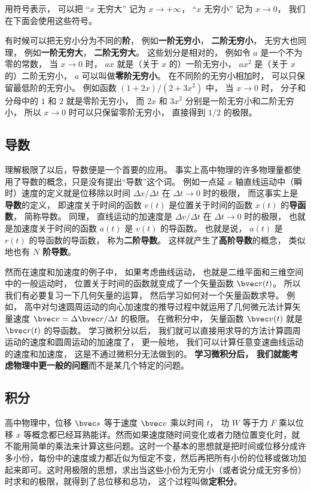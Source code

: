用符号表示， 可以把 “$x$ 无穷大” 记为 $x \to +\infty$， “$x$ 无穷小” 记为 $x \to 0$， 我们在下面会使用这些符号。

有时候可以把无穷小分为不同的\textbf{阶}， 例如\textbf{一阶无穷小}， \textbf{二阶无穷小}， 无穷大也同理， 例如\textbf{一阶无穷大}， \textbf{二阶无穷大}。 这些划分是相对的， 例如令 $a$ 是一个不为零的常数， 当 $x \to 0$ 时， $a x$ 就是（关于 $x$ 的）一阶无穷小， $a x^2$ 是（关于 $x$ 的）二阶无穷小， $a$ 可以叫做\textbf{零阶无穷小}。 在不同阶的无穷小相加时， 可以只保留最低阶的无穷小。 例如函数 $(1+2x)/(2+3x^2)$ 中， 当 $x\to 0$ 时， 分子和分母中的 $1$ 和 $2$ 就是零阶无穷小， 而 $2x$ 和 $3x^2$ 分别是一阶无穷小和二阶无穷小， 所以 $x\to 0$ 时可以只保留零阶无穷小， 直接得到 $1/2$ 的极限。

\subsection{导数}
理解极限了以后，导数便是一个首要的应用。 事实上高中物理的许多物理量都使用了导数的概念，只是没有提出“导数”这个词。 例如一点延 $x$ 轴直线运动中（瞬时）速度的定义就是位移除以时间 $\Delta x/\Delta t$ 在 $\Delta t \to 0$ 时的极限， 而这事实上是\textbf{导数}的定义， 即速度关于时间的函数 $v(t)$ 是位置关于时间的函数 $x(t)$ 的\textbf{导函数}， 简称导数。 同理， 直线运动的加速度是 $\Delta v/\Delta t$ 在 $\Delta t \to 0$ 时的极限， 也就是加速度关于时间的函数 $a(t)$ 是 $v(t)$ 的导函数。 也就是说， $a(t)$ 是 $r(t)$ 的导函数的导函数， 称为\textbf{二阶导数}。 这样就产生了\textbf{高阶导数}的概念， 类似地也有 \textbf{$N$ 阶导数}。

然而在速度和加速度的例子中， 如果考虑曲线运动， 也就是二维平面和三维空间中的一般运动时， 位置关于时间的函数就变成了一个矢量函数 $\bvec r(t)$。 所以我们有必要复习一下几何矢量的运算， 然后学习如何对一个矢量函数求导。 例如， 高中对匀速圆周运动的向心加速度的推导过程中就运用了几何微元法计算矢量速度 $\bvec v = \Delta \bvec r/\Delta t$ 的极限。 在微积分中， 矢量函数 $\bvec v(t)$ 就是 $\bvec r(t)$ 的导函数。 学习微积分以后， 我们就可以直接用求导的方法计算圆周运动的速度和圆周运动的加速度了， 更一般地， 我们可以计算任意变速曲线运动的速度和加速度， 这是不通过微积分无法做到的。 \textbf{学习微积分后， 我们就能考虑物理中更一般的问题}而不是某几个特定的问题。


\subsection{积分}
高中物理中，位移 $\bvec s$ 等于速度 $\bvec v$ 乘以时间 $t$， 功 $W$ 等于力 $F$ 乘以位移 $x$ 等概念都已经耳熟能详。然而如果速度随时间变化或者力随位置变化时，就不能用简单的乘法来计算这些问题。这时一个基本的思想就是把时间或位移分成许多小份，每份中的速度或力都近似为恒定不变，然后再把所有小份的位移或做功加起来即可。这时用极限的思想，求出当这些小份为无穷小（或者说分成无穷多份）时求和的极限，就得到了总位移和总功， 这个过程叫做\textbf{定积分}。 %

